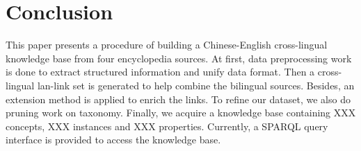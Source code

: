 \documentclass[runningheads,a4paper]{llncs}
\begin{document}

\section{Conclusion}
\label{sec:con}
This paper presents a procedure of building a Chinese-English cross-lingual knowledge base from four encyclopedia sources. At first, data preprocessing work is done to extract structured information and unify data format. Then a cross-lingual lan-link set is generated to help combine the bilingual sources. Besides, an extension method is applied to enrich the links. To refine our dataset, we also do pruning work on taxonomy. Finally, we acquire a knowledge base containing XXX concepts, XXX instances and XXX properties. Currently, a SPARQL query interface is provided to access the knowledge base. 





\end{document}
